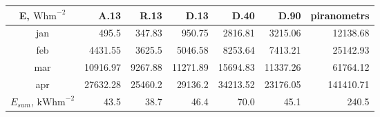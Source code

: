 \begin{tabular}{ | c | r r r r r r | }\hline
E, $\textrm{Whm}^{-2}$	&A.13	&R.13	&D.13	&D.40	&D.90	&piranometrs\\ \hline
jan		&495.5	&347.83	&950.75	&2816.81	&3215.06	&12138.68\\
feb		&4431.55	&3625.5	&5046.58	&8253.64	&7413.21	&25142.93\\
mar		&10916.97	&9267.88	&11271.89	&15694.83	&11337.26	&61764.12\\
apr		&27632.28	&25460.2	&29136.2	&34213.52	&23176.05	&141410.71\\ \hline
$E_{sum}$, $\textrm{kWhm}^{-2}$	&43.5	&38.7	&46.4	&70.0		&45.1	&240.5\\ \hline
\end{tabular}